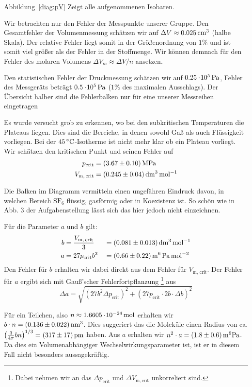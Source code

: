 Abbildung~\ref{diag:pV} Zeigt alle aufgenommenen Isobaren. 

Wir betrachten nur den Fehler der Messpunkte unserer Gruppe.
Den Gesamtfehler der Volumenmessung schätzen wir auf $\Delta V \approx \unit[0.025]{cm^3}$ (halbe Skala). Der relative Fehler liegt somit in der Größenordnung von $1\%$ und ist somit viel größer als der Fehler in der Stoffmenge. Wir können demnach für den Fehler des molaren Volumens $\Delta V_m \approx \Delta V / n$ ansetzen.

Den statistischen Fehler der Druckmessung schätzen wir auf $\unit[0.25 \e{5}]{Pa}$, Fehler des Messgeräts beträgt $\unit[0.5 \e5]{Pa}$ ($1\%$ des maximalen Ausschlags). 
Der Übersicht halber sind die Fehlerbalken nur für eine unserer Messreihen eingetragen

Es wurde versucht grob zu erkennen, wo bei den subkritischen Temperaturen die Plateaus liegen. Dies sind die Bereiche, in denen sowohl Gaß als auch Flüssigkeit vorliegen. Bei der $\unit[45]{ ^\circ C}$-Isotherme ist nicht mehr klar ob ein Plateau vorliegt. Wir schätzen den kritischen Punkt und seinen Fehler auf
\begin{align*}
    p_\mathrm{crit} &= \unit[(3.67 \pm 0.10)]{MPa} \\
    V_\mathrm{m,\, crit} &= \unit[(0.245 \pm 0.04)]{dm^3\, mol^{-1}}
\end{align*}

Die Balken im Diagramm vermitteln einen ungefähren Eindruck davon, in welchen Bereich $\mathrm{S F_6}$ flüssig, gasförmig oder in Koexistenz ist. So schön wie in Abb. 3 der Aufgabenstellung lässt sich das hier jedoch nicht einzeichnen.

Für die Parameter $a$ und $b$ gilt:
%
\begin{alignat*}{3}
    b &= \frac{V_\mathrm{m,\, crit}}{3} &&= \unit[(0.081 \pm  0.013)]{dm^3\, mol^{-1}}\\
    a &= 27 p_\mathrm{crit} b^2 &&= \unit[(0.66 \pm 0.22)]{m^6\, Pa\, mol^{-2}}
\end{alignat*}
%
Den Fehler für $b$ erhalten wir dabei direkt aus dem Fehler für $V_\mathrm{m,\, crit}$. Der Fehler für $a$ ergibt sich mit Gauß'scher Fehlerfortpflanzung%
\footnote{Dabei nehmen wir an das $\Delta p_\mathrm{crit}$ und $\Delta V_\mathrm{m, crit}$ unkorreliert sind.}
aus
\[
    \Delta a = \sqrt{(27 b^2  \Delta p_\mathrm{crit})^2 +
                     (27 p_\mathrm{crit} \cdot 2 b \cdot \Delta b)^2}
\]

Für ein Teilchen, also $n \approx \unit[1.6605\e{-24}]{mol}$ erhalten wir $b \cdot n = \unit[(0.136 \pm 0.022)]{nm^3}$. Dies suggeriert das die Moleküle einen Radius von ca. $\left( \frac{3}{4\pi} b n \right)^{1/3} = \unit[(317 \pm 17)]{pm}$ haben. Aus $a$ erhalten wir $n^2 \cdot a = \unit[(1.8 \pm 0.6)]{m^6 Pa}$. Da dies ein Volumenabhängiger Wechselwirkungsparameter ist, ist er in diesem Fall nicht besonders aussagekräftig.


